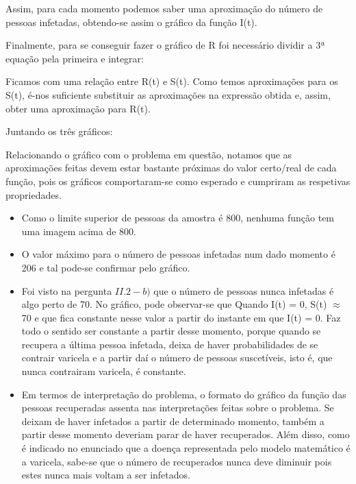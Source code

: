 \documentclass[portuguese, a4paper]{article}
\begin{document}
		Assim, para cada momento podemos saber uma aproximação do número de pessoas infetadas, obtendo-se assim
		o gráfico da função I(t).

		Finalmente, para se conseguir fazer o gráfico de R foi necessário dividir a 3ª equação pela primeira e integrar:

		Ficamos com uma relação entre R(t) e S(t). Como temos aproximações para os S(t),
		é-nos suficiente substituir as aproximações na expressão obtida e, assim, obter uma aproximação para R(t).

		Juntando os três gráficos:


		Relacionando o gráfico com o problema em questão, notamos que as aproximações feitas devem estar
		bastante próximas do valor certo/real de cada função, pois os gráficos comportaram-se como esperado e cumpriram as respetivas propriedades.


		\begin{itemize}
		\item Como o limite superior de pessoas da amostra é 800, nenhuma função tem uma imagem acima de 800.
		\item O valor máximo para o número de pessoas infetadas num dado momento é 206 e tal pode-se confirmar pelo gráfico.
		\item Foi visto na pergunta $II.2-b)$ que o número de pessoas nunca infetadas é algo perto de 70. %
		No gráfico, pode observar-se que Quando I(t) = 0, S(t) $\approx$ 70 e que fica constante nesse valor a partir do instante em que I(t) = 0.
		Faz todo o sentido ser constante a partir desse momento, porque quando se recupera a última pessoa infetada, deixa de haver probabilidades
		de se contrair varicela e a partir daí o número de pessoas suscetíveis, isto é, que nunca contrairam varicela, é constante.
		\item Em termos de interpretação do problema, o formato do gráfico da função das pessoas recuperadas assenta nas interpretações
		feitas sobre o problema. Se deixam de haver infetados a partir de determinado momento,
		também a partir desse momento deveriam parar de haver recuperados.
		Além disso, como é indicado no enunciado que a doença representada pelo modelo matemático é a varicela, sabe-se que o número de recuperados nunca deve diminuir pois estes nunca mais voltam a ser infetados.
		\end{itemize}
\end{document}
